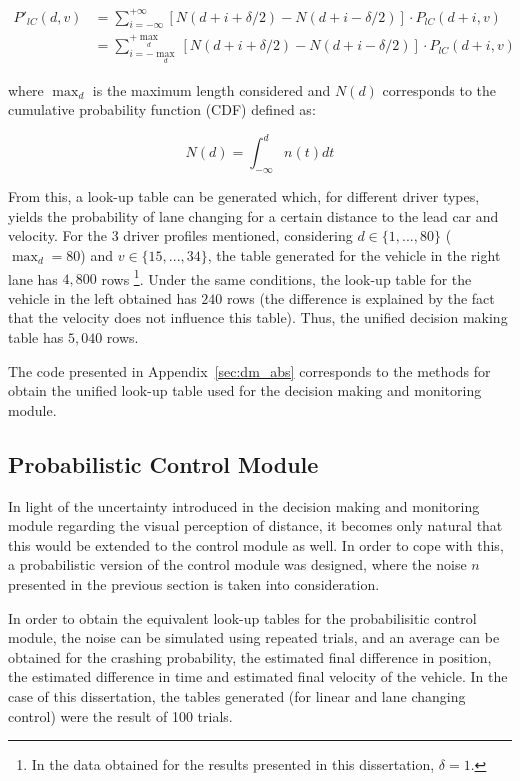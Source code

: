 \begin{equation}
\begin{aligned}
	P'_{lC}(d,v) & = \sum_{i = -\infty}^{+\infty} [N(d + i + \delta/2) - N(d + i - \delta/2)] \cdot P_{lC}(d + i,v) \\
	& = \sum_{i = -\max_d}^{+\max_d} [N(d + i + \delta/2) - N(d + i - \delta/2)] \cdot P_{lC}(d + i,v)
\end{aligned}
\end{equation}

where $\max_d$ is the maximum length considered and $N(d)$ corresponds to the cumulative probability function (CDF) defined as:

\begin{equation}
	N(d) = \int_{-\infty}^d n(t) dt
\end{equation}

From this, a look-up table can be generated which, for different driver types, yields the probability of lane changing for a certain distance to the lead car and velocity. For the 3 driver profiles mentioned, considering $d \in \{1,...,80\}$ ($\max_d = 80$) and $v \in \{15,...,34\}$, the table generated for the vehicle in the right lane has $4,800$ rows \footnote{In the data obtained for the results presented in this dissertation, $\delta = 1$.}. Under the same conditions, the look-up table for the vehicle in the left obtained has $240$ rows (the difference is explained by the fact that the velocity does not influence this table). Thus, the unified decision making table has $5,040$ rows.

The code presented in Appendix~\ref{sec:dm_abs} corresponds to the methods for obtain the unified look-up table used for the decision making and monitoring module.

\subsection{Probabilistic Control Module}
\label{sec:prob_control}

In light of the uncertainty introduced in the decision making and monitoring module regarding the visual perception of distance, it becomes only natural that this would be extended to the control module as well. In order to cope with this, a probabilistic version of the control module was designed, where the noise $n$ presented in the previous section is taken into consideration. 

In order to obtain the equivalent look-up tables for the probabilisitic control module, the noise can be simulated using repeated trials, and an average can be obtained for the crashing probability, the estimated final difference in position, the estimated difference in time and estimated final velocity of the vehicle. In the case of this dissertation, the tables generated (for linear and lane changing control) were the result of 100 trials.

